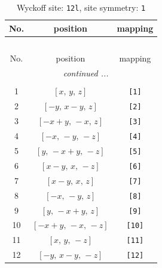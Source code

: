 \documentclass[fleqn,8pt]{jsarticle}
\begin{document}
\begin{longtable}{ccc}
\caption{Wyckoff site: {\tt 12l}, site symmetry: {\tt 1}}
 \\
 \hline \hline
No. & position & mapping \\ \hline \endfirsthead

\multicolumn{2}{l}{\tablename\ \thetable{}} \\
 \hline \hline
No. & position & mapping \\ \hline \endhead

 \hline \hline
\multicolumn{2}{r}{\footnotesize\it continued ...} \\ \endfoot

 \hline \hline
\multicolumn{2}{r}{} \\ \endlastfoot

1 & $\left[ x,\, y,\, z \right]$ & {\tt [1]} \\ \hline
2 & $\left[ - y,\, x - y,\, z \right]$ & {\tt [2]} \\ \hline
3 & $\left[ - x + y,\, - x,\, z \right]$ & {\tt [3]} \\ \hline
4 & $\left[ - x,\, - y,\, - z \right]$ & {\tt [4]} \\ \hline
5 & $\left[ y,\, - x + y,\, - z \right]$ & {\tt [5]} \\ \hline
6 & $\left[ x - y,\, x,\, - z \right]$ & {\tt [6]} \\ \hline
7 & $\left[ x - y,\, x,\, z \right]$ & {\tt [7]} \\ \hline
8 & $\left[ - x,\, - y,\, z \right]$ & {\tt [8]} \\ \hline
9 & $\left[ y,\, - x + y,\, z \right]$ & {\tt [9]} \\ \hline
10 & $\left[ - x + y,\, - x,\, - z \right]$ & {\tt [10]} \\ \hline
11 & $\left[ x,\, y,\, - z \right]$ & {\tt [11]} \\ \hline
12 & $\left[ - y,\, x - y,\, - z \right]$ & {\tt [12]} \\
\end{longtable}
\end{document}
